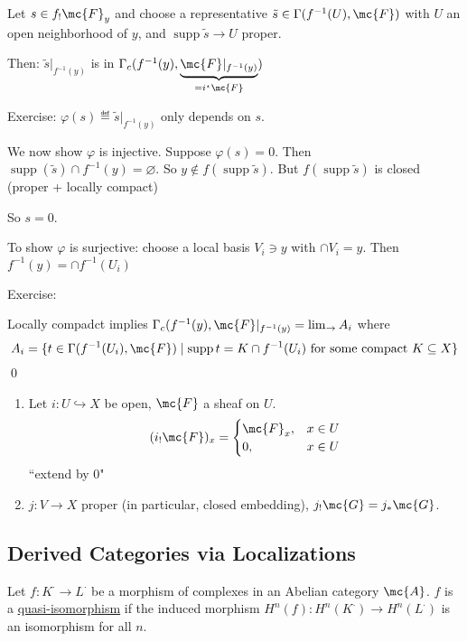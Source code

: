 \documentclass[x11names,reqno,14pt]{extarticle}
\DeclareMathOperator{\supp}{supp}
\newcommand{\into}{\hookrightarrow}
\begin{document}
Let $s \in f_!\mc{F}_y$ and choose a representative $\tilde{s} \in \Gamma(f^{-1}(U), \mc{F})$ with $U$ an open neighborhood of $y$, and $\supp\tilde{s}\to U$ proper. 

Then: $\tilde{s}|_{f^{-1}(y)}$ is in $\Gamma_c(f^{-1}(y), \underbrace{\mc{F}|_{f^{-1}(y)}}_{=i^\star\mc{F}})$

Exercise: $\varphi(s) \eqdef \tilde{s}|_{f^{-1}(y)}$ only depends on $s$. 

We now show $\varphi$ is injective. Suppose $\varphi(s) = 0$. Then $\supp(\tilde{s}) \cap f^{-1}(y) = \varnothing$. So $y\not\in f(\supp\tilde{s})$. But $f(\supp\tilde{s})$ is closed (proper + locally compact)

So $s = 0$. 

To show $\varphi$ is surjective: choose a local basis $V_i \ni y$ with $\cap V_i = y$. Then $f^{-1}(y) = \cap f^{-1}(U_i)$

Exercise:

Locally compadct implies $\Gamma_c(f^{-1}(y), \mc{F}|_{f^{-1}(y)} = \lim_{\to} A_i$ where
\[
A_i = \{t \in \Gamma(f^{-1}(U_i), \mc{F}) \mid \supp t = K \cap f^{-1}(U_i) \text{ for some compact }K \subseteq X\}
\]
\qed

\exm

\begin{enumerate}

\item Let $i:U\into X$ be open, $\mc{F}$ a sheaf on $U$. 
\[
(i_!\mc{F})_x = \begin{cases} \mc{F}_x, & x \in U \\ 0, & x \in U \end{cases}
\]
``extend by 0"

\item $j:V\to X$ proper (in particular, closed embedding), $j_!\mc{G} = j_*\mc{G}$.


\end{enumerate}


\subsection*{Derived Categories via Localizations}


Let $f:K^\cdot\to L^\cdot$ be a morphism of complexes in an Abelian category $\mc{A}$. $f$ is a \underline{quasi-isomorphism} if the induced morphism $H^n(f):H^n(K^\cdot)\to H^n(L^\cdot)$ is an isomorphism for all $n$. 

\end{document}
